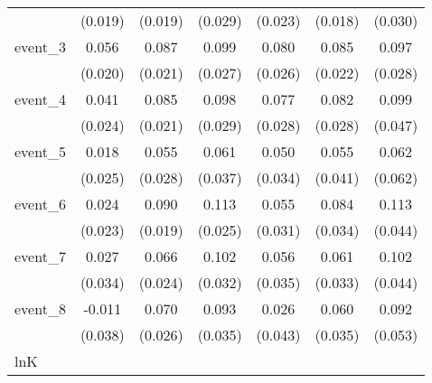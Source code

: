 {\begin{tabular}{l*{6}{c}}
            &     (0.019)         &     (0.019)         &     (0.029)         &     (0.023)         &     (0.018)         &     (0.030)         \\
[1em]
event\_3     &       0.056\sym{**} &       0.087\sym{***}&       0.099\sym{***}&       0.080\sym{**} &       0.085\sym{***}&       0.097\sym{***}\\
            &     (0.020)         &     (0.021)         &     (0.027)         &     (0.026)         &     (0.022)         &     (0.028)         \\
[1em]
event\_4     &       0.041         &       0.085\sym{***}&       0.098\sym{***}&       0.077\sym{**} &       0.082\sym{**} &       0.099\sym{*}  \\
            &     (0.024)         &     (0.021)         &     (0.029)         &     (0.028)         &     (0.028)         &     (0.047)         \\
[1em]
event\_5     &       0.018         &       0.055\sym{*}  &       0.061         &       0.050         &       0.055         &       0.062         \\
            &     (0.025)         &     (0.028)         &     (0.037)         &     (0.034)         &     (0.041)         &     (0.062)         \\
[1em]
event\_6     &       0.024         &       0.090\sym{***}&       0.113\sym{***}&       0.055         &       0.084\sym{*}  &       0.113\sym{*}  \\
            &     (0.023)         &     (0.019)         &     (0.025)         &     (0.031)         &     (0.034)         &     (0.044)         \\
[1em]
event\_7     &       0.027         &       0.066\sym{**} &       0.102\sym{**} &       0.056         &       0.061         &       0.102\sym{*}  \\
            &     (0.034)         &     (0.024)         &     (0.032)         &     (0.035)         &     (0.033)         &     (0.044)         \\
[1em]
event\_8     &      -0.011         &       0.070\sym{**} &       0.093\sym{**} &       0.026         &       0.060         &       0.092         \\
            &     (0.038)         &     (0.026)         &     (0.035)         &     (0.043)         &     (0.035)         &     (0.053)         \\
\hline
lnK         &                     &                     &                     &                     &                     &                     \\

\end{tabular}}
